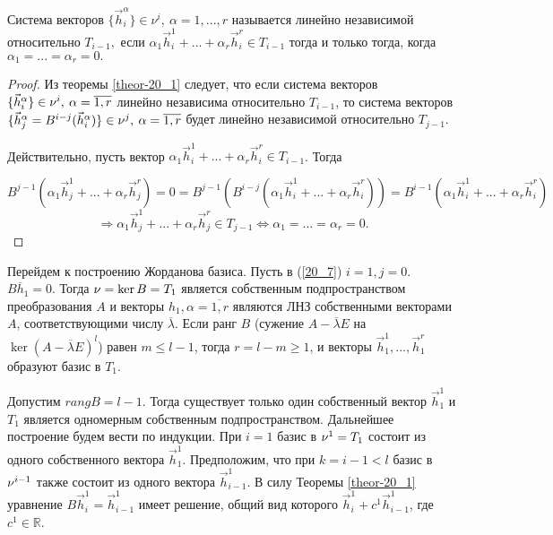 \begin{definition}
	Система векторов $\{\vec{h}_i^{\alpha}\} \in \nu^i, \: \alpha = 1,...,r$ называется линейно  независимой относительно $T_{i - 1},$ если $\alpha_1 \vec{h}_i^1 + ... + \alpha_r \vec{h}_i^r \in T_{i-1}$ тогда и только тогда, когда $\alpha_1 = ... = \alpha_r = 0.$
	\begin{proof}
		Из теоремы \ref{theor-20_1} следует, что если система векторов $\{\vec{h}_i^{\alpha}\} \in \nu^i, \: \alpha = \overline{1,r}$ линейно независима относительно $T_{i-1}$, то система векторов $\{\vec{h}_j^{\alpha} = B^{i-j} (\vec{h}^\alpha_i ) \} \in  \nu^j, \: \alpha = \overline{1,r}$ будет линейно независимой относительно $T_{j-1}.$
		
		Действительно, пусть вектор $\alpha_1 \vec{h}_i^1 + ... + \alpha_r \vec{h}_i^r \in T_{i-1}$. Тогда
		
		\[B^{j-1} (\alpha_1 \vec{h}_j^1 + ... + \alpha_r \vec{h}_j^r) = 0= B^{j - 1} ( B^{i - j} (\alpha_1 \vec{h}_i^1 + ... + \alpha_r \vec{h}_i^r)) = B^{i - 1}(\alpha_1 \vec{h}_i^1 + ... + \alpha_r \vec{h}_i^r)\] 
		\[\Rightarrow \alpha_1 \vec{h}_j^1 + ... + \alpha_r \vec{h}_j^r \in T_{j-1} \Leftrightarrow \alpha_1 = ... = \alpha_r = 0.\]
	\end{proof}
\end{definition}

Перейдем к построению Жорданова базиса. Пусть в (\ref{20_7}) $i = 1, j = 0$. $B\overline{h}_1 = 0$. Тогда $\nu = \ker B = T_1$ является собственным подпространством преобразования $A$ и векторы $h_1, \alpha = \overline{1, r}$ являются ЛНЗ собственными векторами $A$, соответствующими числу $\overline{\lambda}$. Если ранг $B$ (сужение $A - \overline{\lambda} E$ на $\ker (A - \overline{\lambda} E)^l$) равен $m \leqslant l - 1$, тогда $r = l - m \geqslant 1$, и векторы $\vec{h}_1^1, ... , \vec{h}_1^r$ образуют базис в $T_1$.

Допустим $rang B = l - 1$. Тогда существует только один собственный вектор $\vec{h}_1^1$ и $T_1$ является одномерным собственным подпространством. Дальнейшее построение будем вести по индукции. При $i = 1$ базис в $\nu^1 = T_1$ состоит из одного собственного вектора $\vec{h}_1^1$. Предположим, что при $k = i - 1 < l$ базис в $\nu^{i-1}$ также состоит из одного вектора $\vec{h}_{i - 1}^1$. В силу Теоремы \ref{theor-20_1} уравнение $B\vec{h}_i^1 = \vec{h}_{i-1}^1$ имеет решение, общий вид которого $\vec{h}_i^1 + c^1 \vec{h}_{i-1}^1$, где $c^1\in \mathbb{R}$.

